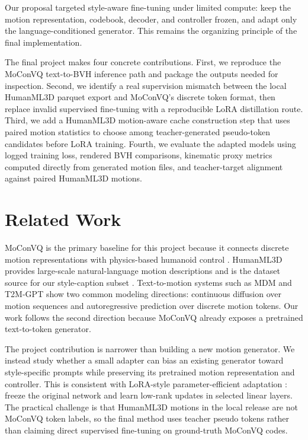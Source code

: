 \documentclass[conference]{IEEEtran}
\begin{document}
Our proposal targeted style-aware fine-tuning under limited compute: keep the motion representation, codebook, decoder, and controller frozen, and adapt only the language-conditioned generator. This remains the organizing principle of the final implementation.

The final project makes four concrete contributions. First, we reproduce the MoConVQ text-to-BVH inference path and package the outputs needed for inspection. Second, we identify a real supervision mismatch between the local HumanML3D parquet export and MoConVQ's discrete token format, then replace invalid supervised fine-tuning with a reproducible LoRA distillation route. Third, we add a HumanML3D motion-aware cache construction step that uses paired motion statistics to choose among teacher-generated pseudo-token candidates before LoRA training. Fourth, we evaluate the adapted models using logged training loss, rendered BVH comparisons, kinematic proxy metrics computed directly from generated motion files, and teacher-target alignment against paired HumanML3D motions.

\section{Related Work}
MoConVQ is the primary baseline for this project because it connects discrete motion representations with physics-based humanoid control \cite{yao2024moconvq}. HumanML3D provides large-scale natural-language motion descriptions and is the dataset source for our style-caption subset \cite{guo2022humanml3d}. Text-to-motion systems such as MDM \cite{tevet2023mdm} and T2M-GPT \cite{zhang2023t2mgpt} show two common modeling directions: continuous diffusion over motion sequences and autoregressive prediction over discrete motion tokens. Our work follows the second direction because MoConVQ already exposes a pretrained text-to-token generator.

The project contribution is narrower than building a new motion generator. We instead study whether a small adapter can bias an existing generator toward style-specific prompts while preserving its pretrained motion representation and controller. This is consistent with LoRA-style parameter-efficient adaptation \cite{hu2022lora}: freeze the original network and learn low-rank updates in selected linear layers. The practical challenge is that HumanML3D motions in the local release are not MoConVQ token labels, so the final method uses teacher pseudo tokens rather than claiming direct supervised fine-tuning on ground-truth MoConVQ codes.
\end{document}
